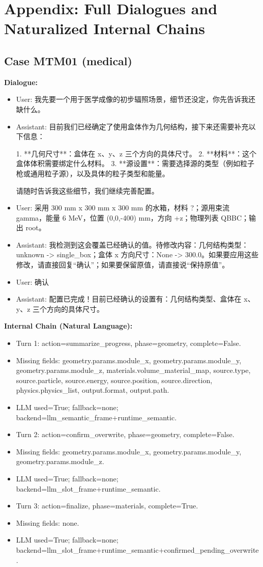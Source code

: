 \documentclass[11pt]{ctexart}
\begin{document}
\section{Appendix: Full Dialogues and Naturalized Internal Chains}
\subsection{Case MTM01 (medical)}
\textbf{Dialogue:}
\begin{itemize}
\item User: 我先要一个用于医学成像的初步辐照场景，细节还没定，你先告诉我还缺什么。
\item Assistant: 目前我们已经确定了使用盒体作为几何结构，接下来还需要补充以下信息：

1.  **几何尺寸**：盒体在 x、y、z 三个方向的具体尺寸。
2.  **材料**：这个盒体体积需要绑定什么材料。
3.  **源设置**：需要选择源的类型（例如粒子枪或通用粒子源），以及具体的粒子类型和能量。

请随时告诉我这些细节，我们继续完善配置。
\item User: 采用 300 mm x 300 mm x 300 mm 的水箱，材料 ?；源用束流 gamma，能量 6 MeV，位置 (0,0,-400) mm，方向 +z；物理列表 QBBC；输出 root。
\item Assistant: 我检测到这会覆盖已经确认的值。待修改内容：几何结构类型：unknown -> single\_box；盒体 x 方向尺寸：None -> 300.0。如果要应用这些修改，请直接回复“确认”；如果要保留原值，请直接说“保持原值”。
\item User: 确认
\item Assistant: 配置已完成！目前已经确认的设置有：几何结构类型、盒体在 x、y、z 三个方向的具体尺寸。
\end{itemize}
\textbf{Internal Chain (Natural Language):}
\begin{itemize}
\item Turn 1: action=summarize\_progress, phase=geometry, complete=False.
\item Missing fields: geometry.params.module\_x, geometry.params.module\_y, geometry.params.module\_z, materials.volume\_material\_map, source.type, source.particle, source.energy, source.position, source.direction, physics.physics\_list, output.format, output.path.
\item LLM used=True; fallback=none; backend=llm\_semantic\_frame+runtime\_semantic.
\item Turn 2: action=confirm\_overwrite, phase=geometry, complete=False.
\item Missing fields: geometry.params.module\_x, geometry.params.module\_y, geometry.params.module\_z.
\item LLM used=True; fallback=none; backend=llm\_slot\_frame+runtime\_semantic.
\item Turn 3: action=finalize, phase=materials, complete=True.
\item Missing fields: none.
\item LLM used=True; fallback=none; backend=llm\_slot\_frame+runtime\_semantic+confirmed\_pending\_overwrite.
\end{itemize}
\end{document}
